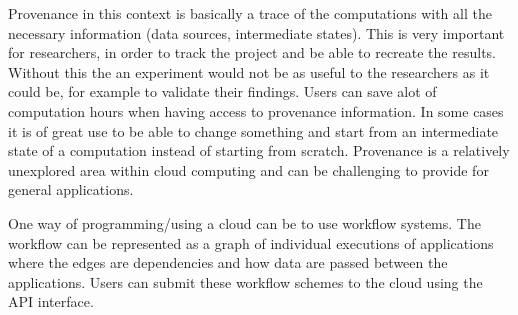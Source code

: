 

Provenance in this context is basically a trace of the computations
with all the necessary information (data sources, intermediate
states). This is very important for researchers, in order to track the
project and be able to recreate the results. Without this the an
experiment would not be as useful to the researchers as it could be,
for example to validate their findings. Users can save alot of
computation hours when having access to provenance information. In
some cases it is of great use to be able to change something and start
from an intermediate state of a computation instead of starting from
scratch. Provenance is a relatively unexplored area within cloud
computing and can be challenging to provide for general applications.




One way of programming/using a cloud can be to use workflow
systems. The workflow can be represented as a graph of individual
executions of applications where the edges are dependencies and how
data are passed between the applications. Users can submit these
workflow schemes to the cloud using the API interface.





